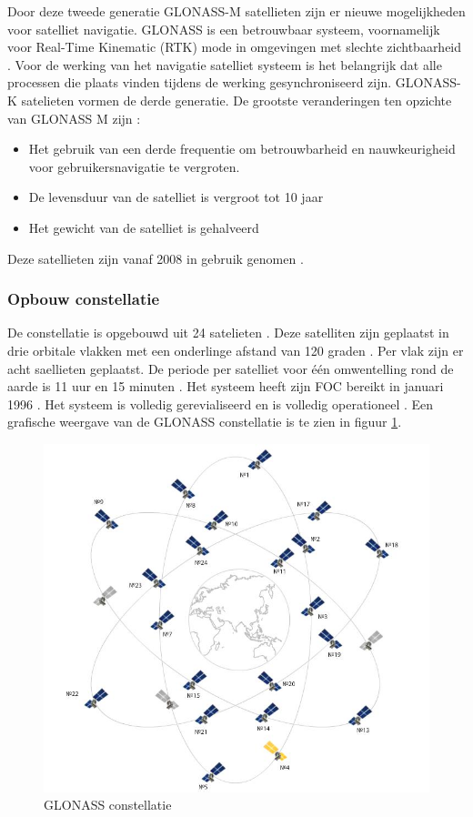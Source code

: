 Door deze tweede generatie GLONASS-M satellieten zijn er nieuwe mogelijkheden voor satelliet navigatie. GLONASS is een betrouwbaar systeem, voornamelijk voor Real-Time Kinematic (RTK) mode in omgevingen met slechte zichtbaarheid \cite{LBibGLONASS}. Voor de werking van het navigatie satelliet systeem is het belangrijk dat alle processen die plaats vinden tijdens de werking gesynchroniseerd zijn. GLONASS-K satelieten vormen de derde generatie. De grootste veranderingen ten opzichte van GLONASS M zijn \cite{LBibGLONASS2}:
\begin{itemize}
	\item Het gebruik van een derde frequentie om betrouwbarheid en nauwkeurigheid voor gebruikersnavigatie te vergroten.
	\item De levensduur van de satelliet is vergroot tot 10 jaar
	\item Het gewicht van de satelliet is gehalveerd
\end{itemize}
Deze satellieten zijn vanaf 2008 in gebruik genomen \cite{LBibPPP}.

\subsubsection{Opbouw constellatie} 
De constellatie is opgebouwd uit 24 satelieten \cite{LBibGNSS4}. Deze satelliten zijn geplaatst in drie orbitale vlakken met een onderlinge afstand van 120 graden \cite{LBibGLONASS2,LBibGNSS6, LBibGNSS8}. Per vlak zijn er acht saellieten geplaatst. De periode per satelliet voor \'e\'en omwentelling rond de aarde is 11 uur en 15 minuten \cite{LBibGNSS6}.  Het systeem heeft zijn FOC bereikt in januari 1996 \cite{LBibGLONASS}. Het systeem is volledig gerevialiseerd en is volledig operationeel \cite{LBibGNSS4}. Een grafische weergave van de GLONASS constellatie is te zien in figuur \ref{imgGLONASS}.

\begin{figure}[hpb]
	\includegraphics[scale=0.65]{GLONASS.jpg}
	\caption{GLONASS constellatie \cite{LImgGLONASS}}
	\label{imgGLONASS}
\end{figure}

